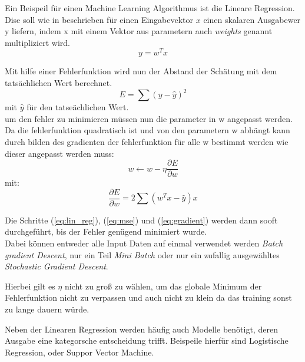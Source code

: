 Ein Beispeil für einen Machine Learning Algorithmus ist die Lineare Regression. Dise soll wie in \cite{goodfellowDeepLearning2016a} 
beschrieben für einen Eingabevektor $x$ einen skalaren Ausgabewer y liefern, indem x mit einem Vektor aus parametern auch 
\textit{weights} genannt multipliziert wird.
\begin{equation}
    y = w^{T}x
    \label{eq:lin_reg}
\end{equation}


Mit hilfe einer Fehlerfunktion wird nun der Abstand der Schätung mit dem tatsächlichen Wert berechnet.
\begin{equation}
    E = \sum (y - \hat y)^{2}
    \label{eq:mse}
\end{equation}
mit $\hat y$ für den tatseächlichen Wert.\\ 
um den fehler zu minimieren müssen nun die parameter in w angepasst werden.\\
Da die fehlerfunktion quadratisch ist und von den parametern w abhängt kann durch bilden des gradienten der fehlerfunktion
für alle w bestimmt werden wie dieser angepasst werden muss:
\begin{equation}
    w  \leftarrow w - \eta \frac{\partial E}{\partial w}
    \label{eq:gradient}
\end{equation}
mit:
\begin{equation}
    \frac{\partial E}{\partial w} =  2 \sum (w^{T}x - \hat y)x
    \label{eq:gradient}
\end{equation}


Die Schritte (\ref{eq:lin_reg}), (\ref{eq:mse}) und (\ref{eq:gradient}) werden dann sooft durchgeführt, bis der Fehler 
genügend minimiert wurde.\\
Dabei können entweder alle Input Daten auf einmal verwendet werden \textit{Batch gradient Descent}, nur ein Teil \textit{Mini Batch} oder
nur ein zufallig ausgewähltes \textit{Stochastic Gradient Descent}.



Hierbei gilt es $\eta$ nicht zu groß zu wählen, um das globale Minimum der Fehlerfunktion nicht zu verpassen 
und auch nicht zu klein da das training sonst zu lange dauern würde. 

Neben der Linearen Regression werden häufig auch Modelle benötigt, deren Ausgabe eine kategorsche entscheidung trifft. 
Beispeile hierfür sind Logistische Regression, oder Suppor Vector Machine.



